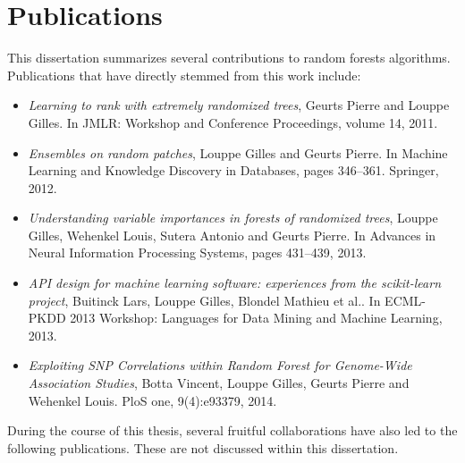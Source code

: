 \section{Publications}

This dissertation summarizes several contributions to random forests
algorithms. Publications that have directly stemmed from this work include:

\begin{itemize}
\item \citep{geurts:2011} \textit{Learning to rank with extremely randomized trees},
Geurts Pierre and Louppe Gilles.
In JMLR: Workshop and Conference Proceedings, volume 14, 2011.

\item \citep{louppe:2012} \textit{Ensembles on random patches},
Louppe Gilles and Geurts Pierre.
In Machine Learning and Knowledge Discovery in Databases, pages 346--361. Springer, 2012.

\item \citep{louppe:2013} \textit{Understanding variable importances in forests of randomized trees},
Louppe Gilles, Wehenkel Louis, Sutera Antonio and Geurts Pierre.
In Advances in Neural Information Processing Systems, pages 431--439, 2013.

\item \citep{buitinck:2013} \textit{API design for machine learning software: experiences from the scikit-learn project},
Buitinck Lars, Louppe Gilles, Blondel Mathieu et al..
In ECML-PKDD 2013 Workshop: Languages for Data Mining and Machine Learning, 2013.

\item \citep{botta:2014} \textit{Exploiting SNP Correlations within Random Forest for Genome-Wide Association Studies},
Botta Vincent, Louppe Gilles, Geurts Pierre and Wehenkel Louis.
PloS one, 9(4):e93379, 2014.

\end{itemize}

During the course of this thesis, several fruitful collaborations have also
led to the following publications. These are not discussed within
this dissertation.

